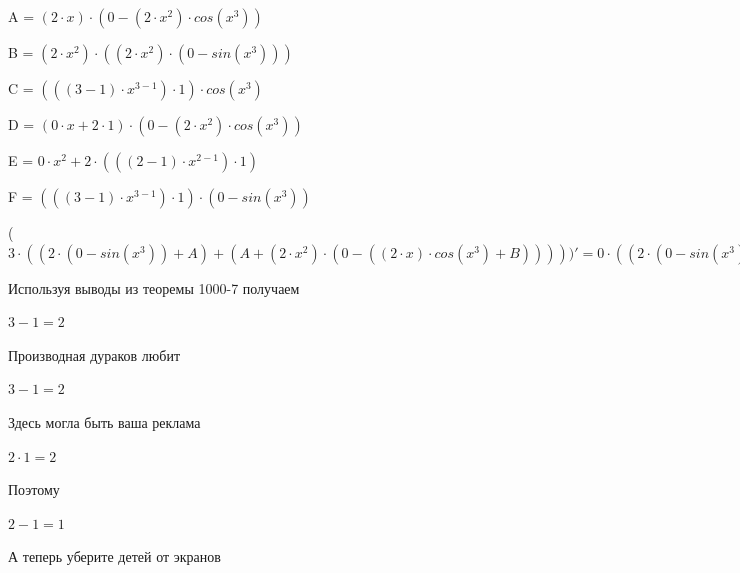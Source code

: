 \documentclass[12pt,a4paper,fleqn]{article}
\begin{document}
\begin{center}
A = $(2 \cdot x) \cdot (0-(2 \cdot x^{2}) \cdot cos(x^{3}))$\end{center}
\begin{center}
B = $(2 \cdot x^{2}) \cdot ((2 \cdot x^{2}) \cdot (0-sin(x^{3})))$\end{center}
\begin{center}
C = $(((3-1) \cdot x^{3-1}) \cdot 1) \cdot cos(x^{3})$\end{center}
\begin{center}
D = $(0 \cdot x+2 \cdot 1) \cdot (0-(2 \cdot x^{2}) \cdot cos(x^{3}))$\end{center}
\begin{center}
E = $0 \cdot x^{2}+2 \cdot (((2-1) \cdot x^{2-1}) \cdot 1)$\end{center}
\begin{center}
F = $(((3-1) \cdot x^{3-1}) \cdot 1) \cdot (0-sin(x^{3}))$\end{center}
\begin{center}
 ($3 \cdot ((2 \cdot (0-sin(x^{3}))+A)+(A+(2 \cdot x^{2}) \cdot (0-((2 \cdot x) \cdot cos(x^{3})+B)))))'
  = 0 \cdot ((2 \cdot (0-sin(x^{3}))+A)+(A+(2 \cdot x^{2}) \cdot (0-((2 \cdot x) \cdot cos(x^{3})+B))))+3 \cdot (((0 \cdot (0-sin(x^{3}))+2 \cdot (0-C))+(D+(2 \cdot x) \cdot (0-((E) \cdot cos(x^{3})+(2 \cdot x^{2}) \cdot (F)))))+((D+(2 \cdot x) \cdot (0-((E) \cdot cos(x^{3})+(2 \cdot x^{2}) \cdot (F))))+((E) \cdot (0-((2 \cdot x) \cdot cos(x^{3})+B))+(2 \cdot x^{2}) \cdot (0-(((0 \cdot x+2 \cdot 1) \cdot cos(x^{3})+(2 \cdot x) \cdot (F))+((E) \cdot ((2 \cdot x^{2}) \cdot (0-sin(x^{3})))+(2 \cdot x^{2}) \cdot ((E) \cdot (0-sin(x^{3}))+(2 \cdot x^{2}) \cdot (0-C))))))))$\end{center}
Используя выводы из теоремы 1000-7 получаем

\begin{center}$3-1 = 2$\end{center}
Производная дураков любит\cite{link2}

\begin{center}$3-1 = 2$\end{center}
Здесь могла быть ваша реклама

\begin{center}$2 \cdot 1 = 2$\end{center}
Поэтому

\begin{center}$2-1 = 1$\end{center}
А теперь уберите детей от экранов
\end{document}
